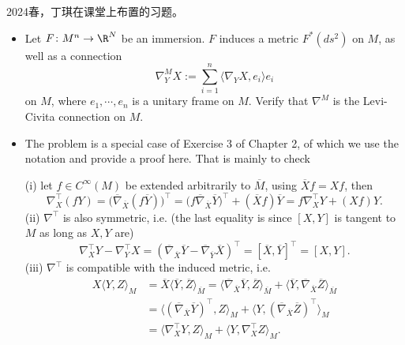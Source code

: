
\qquad 2024春，丁琪在课堂上布置的习题。

\begin{itemize}
    \item[1.] Let $F\colon M^n\to\R^N$ be an immersion. 
    $F$ induces a metric $F^*(ds^2)$ on $M$, as well as a connection
    \[\nabla^M_YX:=\sum_{i=1}^n\langle \nabla_Y X,e_i \rangle e_i\]
    on $M$, where $e_1,\cdots,e_n$ is a unitary frame on $M$. 
    Verify that $\nabla^M$ is the Levi-Civita connection on $M$.

    \item[Pf.]
    The problem is a special case of Exercise 3 of Chapter 2, 
    of which we use the notation and provide a proof here. 
    That is mainly to check

    (i) let $f\in C^\infty(M)$ be extended arbitrarily to $\overline{M}$, 
    using $\overline{X}f=Xf$, then
    \[\nabla_X^\top(fY)
    =\big(\overline{\nabla}_{\overline{X}}(f\overline{Y})\big)^\top
    =\big(f\overline{\nabla}_{\overline{X}}\overline{Y}\big)^\top
    +({\overline{X}}f)\overline{Y}=f\nabla_X^\top Y+(Xf)Y.\]
    (ii) $\nabla^\top$ is also symmetric, i.e. 
    (the last equality is since $[X,Y]$ is tangent to $M$ as long as $X,Y$ are)
    \[\nabla_X^\top Y-\nabla_Y^\top X
    =(\overline{\nabla}_{\overline{X}}\overline{Y}
    -\overline{\nabla}_{\overline{Y}}\overline{X})^\top
    =[\overline{X},\overline{Y}]^\top=[X,Y].\]
    (iii) $\nabla^\top$ is compatible with the induced metric, i.e.
    \begin{align*}
    X\langle Y,Z \rangle_M
    &=\overline{X}\langle \overline{Y},\overline{Z} \rangle_{\overline{M}}
    =\langle \overline{\nabla}_{\overline{X}}\overline{Y},\overline{Z} \rangle_{\overline{M}}
    +\langle \overline{Y},\overline{\nabla}_{\overline{X}}\overline{Z} \rangle_{\overline{M}}\\
    &=\langle (\overline{\nabla}_{\overline{X}}\overline{Y})^\top,Z \rangle_M
    +\langle Y,(\overline{\nabla}_{\overline{X}}\overline{Z})^\top \rangle_M\\
    &=\langle \nabla_X^\top Y,Z \rangle_M+\langle Y,\nabla_X^\top Z \rangle_M.
    \end{align*}


\end{itemize}
